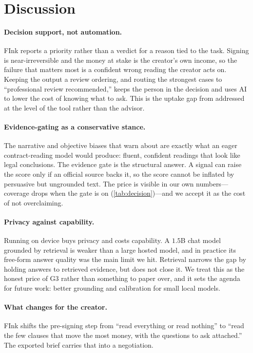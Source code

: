 \documentclass{article}
\theoremstyle{plain}
\begin{document}
\section{Discussion}
\label{sec:discussion}

\paragraph{Decision support, not automation.}
FInk reports a priority rather than a verdict for a reason tied to the task.
Signing is near-irreversible and the money at stake is the creator's own income,
so the failure that matters most is a confident wrong reading the creator acts on.
Keeping the output a review ordering, and routing the strongest cases to
``professional review recommended,'' keeps the person in the decision and uses AI
to lower the cost of knowing what to ask. This is the uptake gap from
\citet{bhattacharya2012advice} addressed at the level of the tool rather than the
advisor.

\paragraph{Evidence-gating as a conservative stance.}
The narrative and objective biases that \citet{kong2026bias} warn about are
exactly what an eager contract-reading model would produce: fluent, confident
readings that look like legal conclusions. The evidence gate is the structural
answer. A signal can raise the score only if an official source backs it, so the
score cannot be inflated by persuasive but ungrounded text. The price is visible
in our own numbers---coverage drops when the gate is on (\cref{tab:decision})---and
we accept it as the cost of not overclaiming.

\paragraph{Privacy against capability.}
Running on device buys privacy and costs capability. A $1.5$B chat model grounded
by retrieval is weaker than a large hosted model, and in practice its free-form
answer quality was the main limit we hit. Retrieval narrows the gap by holding
answers to retrieved evidence, but does not close it. We treat this as the honest
price of G3 rather than something to paper over, and it sets the agenda for future
work: better grounding and calibration for small local models.

\paragraph{What changes for the creator.}
FInk shifts the pre-signing step from ``read everything or read nothing'' to
``read the few clauses that move the most money, with the questions to ask
attached.'' The exported brief carries that into a negotiation.
\end{document}
